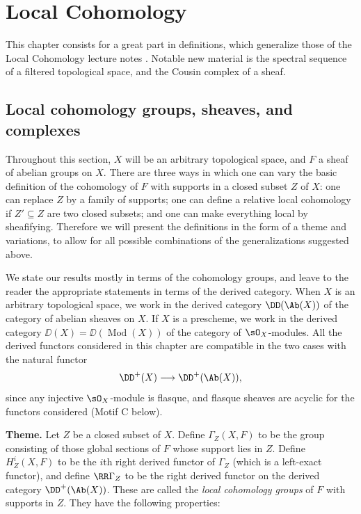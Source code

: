 
\chapter{Local Cohomology}
\begingroup
\setlength{\emergencystretch}{2em}

This chapter consists for a great part in definitions, which generalize those of the Local Cohomology lecture notes \cite{LC}. Notable new material is the spectral sequence of a filtered topological space, and the Cousin complex of a sheaf.

\section{Local cohomology groups, sheaves, and complexes}\label{sec:4.1}

Throughout this section, $X$ will be an arbitrary topological space, and $F$ a sheaf of abelian groups on $X$. There are three ways in which one can vary the basic definition of the cohomology of $F$ with supports in a closed subset $Z$ of $X$: one can replace $Z$ by a family of supports; one can define a relative local cohomology if $Z'\subseteq Z$ are two closed subsets; and one can make everything local by sheafifying. Therefore we will present the definitions in the form of a theme and variations, to allow for all possible combinations of the generalizations suggested above.

We state our results mostly in terms of the cohomology groups, and leave to the reader the appropriate statements in terms of the derived category. When $X$ is an arbitrary topological space, we work in the derived category $\DD(\Ab(X))$ of the category of abelian sheaves on $X$. If $X$ is a prescheme, we work in the derived category $\DD(X)=\DD(\operatorname{Mod}(X))$ of the category of $\sO_X$-modules. All the derived functors considered in this chapter are compatible in the two cases with the natural functor
\[
\DD^+(X)\longrightarrow \DD^+(\Ab(X)),
\]
since any injective $\sO_X$-module is flasque, and flasque sheaves are acyclic for the functors considered (Motif C below).

\medskip\noindent\textbf{Theme.}
Let $Z$ be a closed subset of $X$. Define $\Gamma_Z(X,F)$ to be the group consisting of those global sections of $F$ whose support lies in $Z$. Define $H_Z^i(X,F)$ to be the $i$th right derived functor of $\Gamma_Z$ (which is a left-exact functor), and define $\RR\Gamma_Z$ to be the right derived functor on the derived category $\DD^+(\Ab(X))$. These are called the \emph{local cohomology groups} of $F$ with supports in $Z$. They have the following properties:

